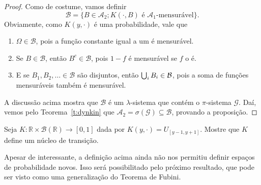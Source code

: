 \begin{proof}
  Como de costume, vamos definir
  \begin{equation}
    \mathcal{B} = \{B \in \mathcal{A}_2; K(\cdot, B) \text{ é $\mathcal{A}_1$-mensurável}\}.
  \end{equation}
  Obviamente, como $K(y, \cdot)$ é uma probabilidade, vale que
  \begin{enumerate}[\quad a)]
  \item $\Omega \in \mathcal{B}$, pois a função constante igual a um é mensurável.
  \item Se $B \in \mathcal{B}$, então $B^c \in \mathcal{B}$, pois $1 - f$ é mensurável se $f$ o é.
  \item E se $B_1, B_2, \dots \in \mathcal{B}$ são disjuntos, então $\operatorname*{{\textstyle \bigcup}}_i B_i \in \mathcal{B}$, pois a soma de funções mensuráveis também é mensurável.
  \end{enumerate}

  A discussão acima mostra que $\mathcal{B}$ é um $\lambda$-sistema que contém o $\pi$-sistema $\mathcal{G}$.
  Daí, vemos pelo Teorema~\ref{t:dynkin} que $\mathcal{A}_2 = \sigma(\mathcal{G}) \subseteq \mathcal{B}$, provando a proposição.
\end{proof}

\begin{exercise}
  Seja $K:\mathbb{R} \times \mathcal{B}(\mathbb{R}) \to [0,1]$ dada por $K(y, \cdot) = U_{[y - 1,y + 1]}$.
  Mostre que $K$ define um núcleo de transição.
\end{exercise}

Apesar de interessante, a definição acima ainda não nos permitiu definir espaços de probabilidade novos.
Isso será possibilitado pelo próximo resultado, que pode ser visto como uma generalização do Teorema de Fubini.



